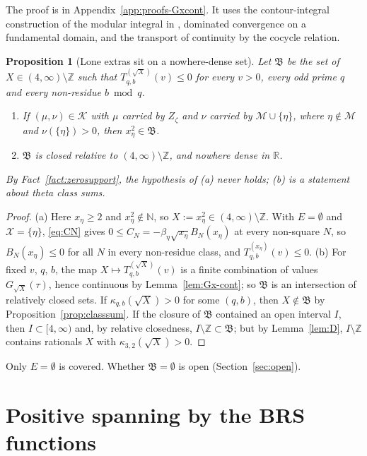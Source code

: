 \documentclass[11pt]{amsart}
\newcommand{\RR}{\mathbb R}
\newcommand{\ZZ}{\mathbb Z}
\newcommand{\NN}{\mathbb N}
\newcommand{\BRS}{\mathcal M}
\newcommand{\Zz}{Z_\zeta}
\newcommand{\Kad}{\mathcal K}
\newtheorem{proposition}[theorem]{Proposition}
\theoremstyle{definition}
\theoremstyle{remark}
\numberwithin{equation}{section}
\begin{document}
The proof is in Appendix~\ref{app:proofs-Gxcont}. It uses the contour-integral construction of the modular integral in
\cite[\S3.3]{BRS}, dominated convergence on a fundamental domain, and the transport of continuity by the cocycle relation.

\begin{proposition}[Lone extras sit on a nowhere-dense set]\label{prop:C0}
Let $\mathfrak B$ be the set of $X\in(4,\infty)\setminus\ZZ$ such that $T^{(\sqrt X)}_{q,b}(v)\le0$ for every $v>0$, every odd prime $q$ and every
non-residue $b\bmod q$.
\begin{enumerate}[label=\textup{(\alph*)}]
\item If $(\mu,\nu)\in\Kad$ with $\mu$ carried by $\Zz$ and $\nu$ carried by $\BRS\cup\{\eta\}$, where $\eta\notin\BRS$ and $\nu(\{\eta\})>0$, then
$x_\eta^2\in\mathfrak B$.
\item $\mathfrak B$ is closed relative to $(4,\infty)\setminus\ZZ$, and nowhere dense in $\RR$.
\end{enumerate}
By Fact~\ref{fact:zerosupport}, the hypothesis of \textup{(a)} never holds; \textup{(b)} is a statement about theta class sums.
\end{proposition}

\begin{proof}
(a) Here $x_\eta\ge2$ and $x_\eta^2\notin\NN$, so $X:=x_\eta^2\in(4,\infty)\setminus\ZZ$. With $E=\emptyset$ and $\mathcal X=\{\eta\}$,
\eqref{eq:CN} gives $0\le C_N=-\beta_\eta\sqrt{x_\eta}B_N(x_\eta)$ at every non-square $N$, so $B_N(x_\eta)\le0$ for all $N$ in every
non-residue class, and $T^{(x_\eta)}_{q,b}(v)\le0$. (b) For fixed $v$, $q$, $b$, the map $X\mapsto T^{(\sqrt X)}_{q,b}(v)$ is a finite
combination of values $G_{\sqrt X}(\tau)$, hence continuous by Lemma~\ref{lem:Gx-cont}; so $\mathfrak B$ is an intersection of relatively
closed sets. If $\kappa_{q,b}(\sqrt X)>0$ for some $(q,b)$, then $X\notin\mathfrak B$ by Proposition~\ref{prop:classsum}. If the closure of
$\mathfrak B$ contained an open interval $I$, then $I\subset[4,\infty)$ and, by relative closedness, $I\setminus\ZZ\subset\mathfrak B$; but by
Lemma~\ref{lem:D}, $I\setminus\ZZ$ contains rationals $X$ with $\kappa_{3,2}(\sqrt X)>0$.
\end{proof}

Only $E=\emptyset$ is covered. Whether $\mathfrak B=\emptyset$ is open (Section~\ref{sec:open}).

\section{Positive spanning by the BRS functions}\label{sec:signpatterns}
\end{document}
